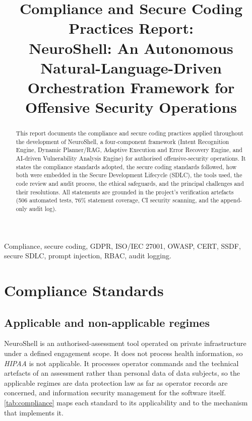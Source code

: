 \documentclass[10pt,journal,onecolumn]{IEEEtran}
\title{Compliance and Secure Coding Practices Report:\\[0.3em]
NeuroShell: An Autonomous Natural-Language-Driven Orchestration
Framework for Offensive Security Operations}
\author{\IEEEauthorblockN{NeuroShell Core Team --- Group R26-CS-018}
\IEEEauthorblockA{Department of Computer Systems Engineering\\
MSc Cybersecurity Research Project\\
Supervisor: Prof.\ Harinda Fernando}}
\newcommand{\std}[1]{\textit{#1}}
\begin{document}
\maketitle

\begin{abstract}
This report documents the compliance and secure coding practices applied
throughout the development of NeuroShell, a four-component framework
(Intent Recognition Engine, Dynamic Planner/RAG, Adaptive Execution and
Error Recovery Engine, and AI-driven Vulnerability Analysis Engine) for
authorised offensive-security operations. It states the compliance
standards adopted, the secure coding standards followed, how both were
embedded in the Secure Development Lifecycle (SDLC), the tools used, the
code review and audit process, the ethical safeguards, and the principal
challenges and their resolutions. All statements are grounded in the
project's verification artefacts (506 automated tests, 76\% statement
coverage, CI security scanning, and the append-only audit log).
\end{abstract}

\begin{IEEEkeywords}
Compliance, secure coding, GDPR, ISO/IEC 27001, OWASP, CERT, SSDF,
secure SDLC, prompt injection, RBAC, audit logging.
\end{IEEEkeywords}

\section{Compliance Standards}

\subsection{Applicable and non-applicable regimes}
NeuroShell is an authorised-assessment tool operated on private
infrastructure under a defined engagement scope. It does not process
health information, so \std{HIPAA} is not applicable. It processes
operator commands and the technical artefacts of an assessment rather
than personal data of data subjects, so the applicable regimes are data
protection law as far as operator records are concerned, and information
security management for the software itself. \cref{tab:compliance} maps
each standard to its applicability and to the mechanism that implements
it.
\end{document}
